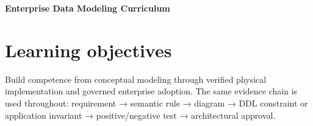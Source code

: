 \documentclass[11pt,letterpaper]{article}
\begin{document}
\begin{center}
{\LARGE\bfseries\color{navy} Enterprise Data Modeling Curriculum}\par
\vspace{0.25em}{\large Twelve-week prerequisite-based study program}\par
{}
\end{center}
\vspace{0.8em}
\section{Learning objectives}
Build competence from conceptual modeling through verified physical implementation and governed enterprise adoption. The same evidence chain is used throughout: requirement → semantic rule → diagram → DDL constraint or application invariant → positive/negative test → architectural approval.
\end{document}
